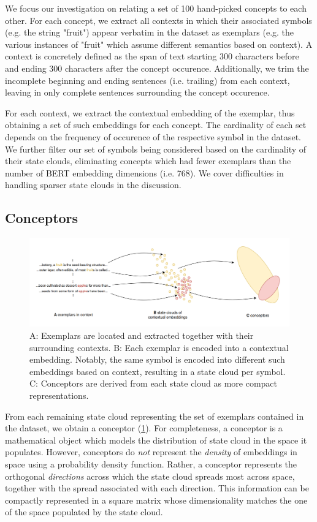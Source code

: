 We focus our investigation on relating a set of 100 hand-picked concepts to each other. For each concept, we extract all contexts in which their associated symbols (e.g. the string "fruit") appear verbatim in the dataset as exemplars (e.g. the various instances of "fruit" which assume different semantics based on context). A context is concretely defined as the span of text starting 300 characters before and ending 300 characters after the concept occurence. Additionally, we trim the incomplete beginning and ending sentences (i.e. trailing) from each context, leaving in only complete sentences surrounding the concept occurence.

For each context, we extract the contextual embedding of the exemplar, thus obtaining a set of such embeddings for each concept. The cardinality of each set depends on the frequency of occurence of the respective symbol in the dataset. We further filter our set of symbols being considered based on the cardinality of their state clouds, eliminating concepts which had fewer exemplars than the number of BERT embedding dimensions (i.e. 768). We cover difficulties in handling sparser state clouds in the discussion.

\subsection{Conceptors}

\begin{figure}[h]
    \centering
    \includegraphics[width=\textwidth]{img/exemplars-conceptors.png}
    \caption{A: Exemplars are located and extracted together with their surrounding contexts. B: Each exemplar is encoded into a contextual embedding. Notably, the same symbol is encoded into different such embeddings based on context, resulting in a state cloud per symbol. C: Conceptors are derived from each state cloud as more compact representations.}\label{fig:exemplars-conceptors}
\end{figure}

From each remaining state cloud representing the set of exemplars contained in the dataset, we obtain a conceptor \citep{jaeger_controlling_2017} (\ref{fig:exemplars-conceptors}). For completeness, a conceptor is a mathematical object which models the distribution of state cloud in the space it populates. However, conceptors do \textit{not} represent the \textit{density} of embeddings in space using a probability density function. Rather, a conceptor represents the orthogonal \textit{directions} across which the state cloud spreads most across space, together with the spread associated with each direction. This information can be compactly represented in a square matrix whose dimensionality matches the one of the space populated by the state cloud.

